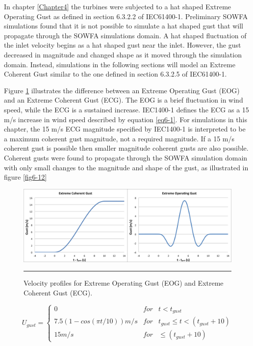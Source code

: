 In chapter \ref{Chapter4} the turbines were subjected to a hat shaped Extreme Operating Gust as defined in section 6.3.2.2 of IEC61400-1\cite{IEC2005}. Preliminary SOWFA simulations found that it is not possible to simulate a hat shaped gust that will propagate through the SOWFA simulations domain. A hat shaped fluctuation of the inlet velocity begins as a hat shaped gust near the inlet. However, the gust decreased in magnitude and changed shape as it moved through the simulation domain. Instead, simulations in the following sections will model an Extreme Coherent Gust similar to the one defined in section 6.3.2.5 of IEC61400-1. 

Figure \ref{fig6-11} illustrates the difference between an Extreme Operating Gust (EOG) and an Extreme Coherent Gust (ECG). The EOG is a brief fluctuation in wind speed, while the ECG is a sustained increase. IEC1400-1 defines the ECG as a 15 m/s increase in wind speed described by equation \ref{eq6-1}. For simulations in this chapter, the 15 m/s ECG magnitude specified by IEC1400-1 is interpreted to be a maximum coherent gust magnitude, not a required magnitude. If a 15 m/s coherent gust is possible then smaller magnitude coherent gusts are also possible. Coherent gusts were found to propagate through the SOWFA simulation domain with only small changes to the magnitude and shape of the gust, as illustrated in figure \ref{fig6-12}



\begin{figure}[htbp] \label{fig6-11} 
	\centering
		\includegraphics[trim = {1cm 0 2cm 0}, clip, width = \linewidth]{Figures/ch6Figures/fig6-11.png}
		\rule{35em}{0.5pt}
	\caption{Velocity profiles for Extreme Operating Gust (EOG) and Extreme Coherent Gust (ECG).}
\end{figure}

\begin{equation} \label{eq6-1}
	U_{gust}=\left\{\begin{matrix}
0 & for  & t<t_{gust}\\ 
 7.5(1-cos(\pi t/10)) m/s & for  & t_{gust} \leq t<(t_{gust}+10)\\ 
 15 m/s &  for & \leq (t_{gust} +10)
\end{matrix}\right. 
\end{equation}

